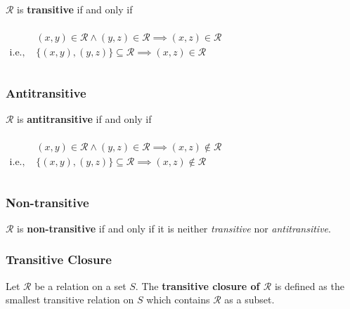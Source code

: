 $\mathcal{R}$ is \textbf{transitive} if and only if

\begin{math}
  \begin{array}{ll}
    \\
    & (x, y) \in \mathcal{R} \land (y, z) \in \mathcal{R} \implies (x, z) \in \mathcal{R}\\
    \text{i.e., } & \{(x, y), (y, z)\} \subseteq \mathcal{R} \implies (x, z) \in \mathcal{R} \\
    \\
  \end{array}
\end{math}


\subsubsection{Antitransitive}

$\mathcal{R}$ is \textbf{antitransitive} if and only if

\begin{math}
  \begin{array}{ll}
    \\
    & (x, y) \in \mathcal{R} \land (y, z) \in \mathcal{R} \implies (x, z) \notin \mathcal{R}\\
    \text{i.e., }& \{ (x, y), (y, z) \} \subseteq \mathcal{R} \implies (x, z) \notin \mathcal{R}\\
    \\
  \end{array}
\end{math}



\subsubsection{Non-transitive}

$\mathcal{R}$ is \textbf{non-transitive} if and only if it is neither
\textit{transitive} nor \textit{antitransitive}.


\subsubsection{Transitive Closure}
\label{sec:transitive-closure}

Let $\mathcal{R}$ be a relation on a set $S$. The \textbf{transitive
  closure of $\mathcal{R}$} is defined as the smallest transitive
relation on $S$ which contains $\mathcal{R}$ as a subset.


